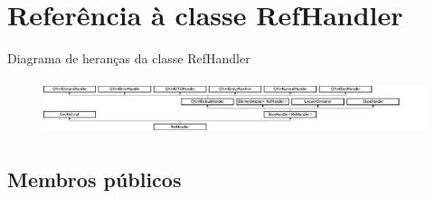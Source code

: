 \hypertarget{class_ref_handler}{\section{Referência à classe Ref\-Handler}
\label{class_ref_handler}
}
Diagrama de heranças da classe Ref\-Handler\begin{figure}[H]
\begin{center}
\leavevmode
\includegraphics[height=1.632653cm]{class_ref_handler}
\end{center}
\end{figure}
\subsection*{Membros públicos}
